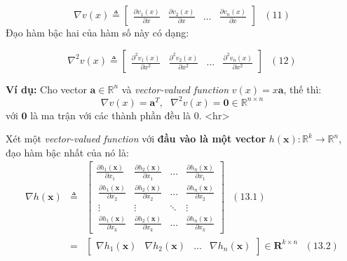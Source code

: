 \documentclass[12pt]{article}
\begin{document}
\begin{equation} 
\label{eqn:grvectorvalued}
\nabla v(x) \triangleq  
\left[ 
\begin{matrix} 
    \frac{\partial v_1(x)}{\partial x} & \frac{\partial v_2(x)}{\partial x} & \dots & \frac{\partial v_n(x)}{\partial x} 
\end{matrix} 
\right] ~~~ (11) 
\end{equation} 
Đạo hàm bậc hai của hàm số này có dạng: 
 
\begin{equation*} 
\nabla^2 v(x) \triangleq  
\left[ 
\begin{matrix} 
    \frac{\partial^2 v_1(x)}{\partial x^2} & \frac{\partial^2 v_2(x)}{\partial x^2} & \dots & \frac{\partial^2 v_n(x)}{\partial x^2} 
\end{matrix} 
\right] ~~~(12) 
\end{equation*} 
 
\textbf{Ví dụ:} Cho vector $\mathbf{a} \in \mathbb{R}^n$ và \textit{vector-valued function} $v(x) = x\mathbf{a}$, thế thì: 
\begin{equation*} 
\nabla v(x) = \mathbf{a}^T, ~~~ \nabla^2 v(x) = \mathbf{0} \in \mathbb{R}^{n\times n} 
\end{equation*} 
với $\mathbf{0}$ là ma trận với các thành phần đều là 0.  
<hr> 
 
Xét một \textit{vector-valued function} với \textbf{đầu vào là một vector} $h(\mathbf{x}):\mathbb{R}^k \rightarrow \mathbb{R}^n$, đạo hàm bậc nhất của nó là: 
\begin{eqnarray*} 
\nabla h(\mathbf{x}) &\triangleq & 
\left[ 
\begin{matrix} 
    \frac{\partial h_1(\mathbf{x})}{\partial x_1} & \frac{\partial h_2(\mathbf{x})}{\partial x_1} & \dots & \frac{\partial h_n(\mathbf{x})}{\partial x_1} \\\  
    \frac{\partial h_1(\mathbf{x})}{\partial x_2} & \frac{\partial h_2(\mathbf{x})}{\partial x_2} & \dots & \frac{\partial h_n(\mathbf{x})}{\partial x_2} \\\  
    \vdots & \vdots & \ddots & \vdots \\\ 
    \frac{\partial h_1(\mathbf{x})}{\partial x_k} & \frac{\partial h_2(\mathbf{x})}{\partial x_k} & \dots & \frac{\partial h_n(\mathbf{x})}{\partial x_k} 
\end{matrix} 
\right]~~~(13.1)\\\ 
& = &  
\left[ 
\begin{matrix} 
    \nabla h_1(\mathbf{x}) & \nabla h_2(\mathbf{x}) & \dots & \nabla h_n(\mathbf{x}) 
\end{matrix} 
\right] \in \mathbf{R}^{k\times n} ~~~ (13.2) 
\end{eqnarray*} 
 
\end{document}
